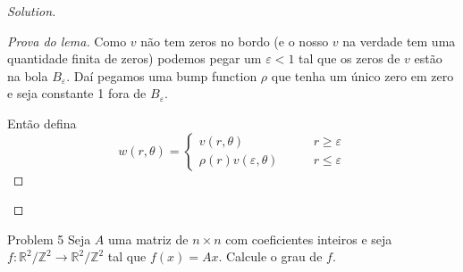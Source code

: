 \begin{proof}[Solution]
\begin{proof}[Prova do lema]\leavevmode
Como \(v\) não tem zeros no bordo (e o nosso \(v\) na verdade tem uma quantidade finita de zeros) podemos pegar um \(\varepsilon<1\) tal que os zeros de \(v\) estão na bola \(B_\varepsilon\). Daí pegamos uma bump function \(\rho\) que tenha um único zero em zero e seja constante 1 fora de \(B_\varepsilon\).

Então defina
\[w(r,\theta)=\begin{cases}
	v(r,\theta)\qquad &r \geq \varepsilon \\
	\rho(r)v(\varepsilon,\theta)\qquad &r \leq \varepsilon
\end{cases}\]
\end{proof}

\end{proof}

\begin{thing1}{Problem 5}\label{prob:5}\leavevmode
Seja \(A\) uma matriz de \(n \times n\) com coeficientes inteiros e seja \(f:\mathbb{R}^2/\mathbb{Z}^2 \to \mathbb{R}^2/\mathbb{Z}^2\) tal que \(f(x)=Ax\). Calcule o grau de \(f\).
\end{thing1}

